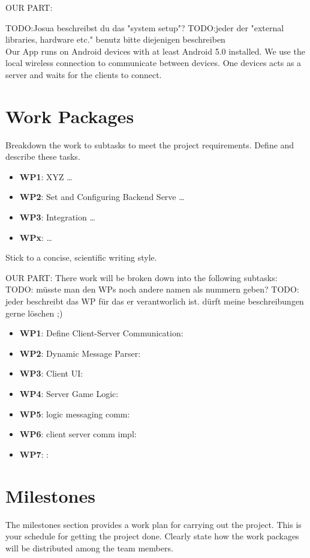 \documentclass{report}
\begin{document}
OUR PART:

TODO:Josua beschreibst du das "system setup"?
TODO:jeder der "external libraries, hardware etc." benutz bitte diejenigen beschreiben
\\
Our App runs on Android devices with at least Android 5.0 installed. We use the local wireless connection to communicate between devices. One devices acts as a server and waits for the clients to connect. 

\section{Work Packages}
Breakdown the work to subtasks to meet the project requirements.
Define and describe these tasks.

\begin{itemize}
        \item {\bf WP1}:  XYZ  \ldots    
        \item {\bf WP2}: Set and Configuring Backend Serve  \ldots    
        \item {\bf WP3}: Integration  \ldots 
         \item {\bf WPx}:  \ldots 
\end{itemize}
 
Stick to a concise, scientific writing style. 

OUR PART:
There work will be broken down into the following subtasks:
TODO: müsste man den WPs noch andere namen als nummern geben?
TODO: jeder beschreibt das WP für das er verantworlich ist. dürft meine beschreibungen gerne löschen ;)
\begin{itemize}
        \item {\bf WP1}: Define Client-Server Communication:   
        \item {\bf WP2}: Dynamic Message Parser:   
        \item {\bf WP3}: Client UI: 
        \item {\bf WP4}: Server Game Logic: 
        \item {\bf WP5}: logic messaging comm:
        \item {\bf WP6}: client server comm impl:
        \item {\bf WP7}: :
\end{itemize}

\section{Milestones}
The milestones section provides a work plan for carrying out the project.
This is your schedule for getting the project done.
Clearly state how the work packages will be distributed among the team members. 
\end{document}
